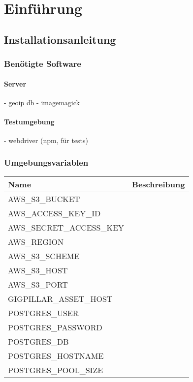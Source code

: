 \chapter{Einführung}\label{AppendixEinführung}

\section{Installationsanleitung}

\subsection{Benötigte Software}

\subsubsection{Server}
- geoip db
- imagemagick

\subsubsection{Testumgebung}
- webdriver (npm, für tests)

\subsection{Umgebungsvariablen}

\begin{longtable}[]{@{}ll@{}}
  \toprule
  \textbf{Name}            & \textbf{Beschreibung}\tabularnewline
  \midrule
  AWS\_S3\_BUCKET          & \tabularnewline
  AWS\_ACCESS\_KEY\_ID     & \tabularnewline
  AWS\_SECRET\_ACCESS\_KEY & \tabularnewline
  AWS\_REGION              & \tabularnewline
  AWS\_S3\_SCHEME          & \tabularnewline
  AWS\_S3\_HOST            & \tabularnewline
  AWS\_S3\_PORT            & \tabularnewline
  GIGPILLAR\_ASSET\_HOST   & \tabularnewline
  POSTGRES\_USER           & \tabularnewline
  POSTGRES\_PASSWORD       & \tabularnewline
  POSTGRES\_DB             & \tabularnewline
  POSTGRES\_HOSTNAME       & \tabularnewline
  POSTGRES\_POOL\_SIZE     & \tabularnewline
  \bottomrule
\end{longtable}
